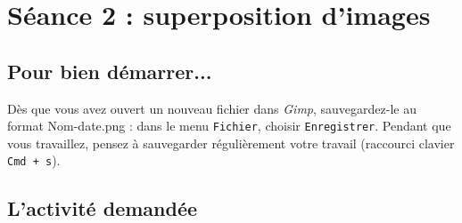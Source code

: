 



%
%
%
%


\section{Séance 2 : superposition d'images}\label{ficheImage5e2}

\subsection{Pour bien démarrer...}

Dès que vous avez ouvert un nouveau fichier dans \emph{Gimp}, sauvegardez-le au format Nom-date.png : dans le menu \texttt{Fichier}, choisir \texttt{Enregistrer}. Pendant que vous travaillez, pensez à sauvegarder régulièrement votre travail (raccourci clavier \texttt{Cmd + s}).   




\subsection{L'activité demandée}

\vspace{10pt}

